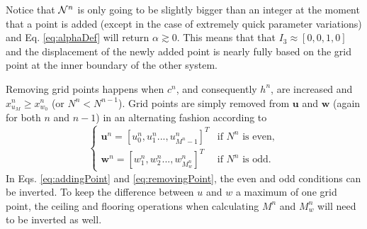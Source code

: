Notice that $\mathcal{N}^n$ is only going to be slightly bigger than an integer at the moment that a point is added (except in the case of extremely quick parameter variations) and Eq. \eqref{eq:alphaDef} will return $\alpha \gtrsim 0$.
This means that that $I_3 \approx [0, 0, 1, 0]$ and the displacement of the newly added point is nearly fully based on the grid point at the inner boundary of the other system. %

Removing grid points happens when $c^n$, and consequently $h^n$, are increased and $x_{u_M}^n \geq x_{w_0}^n$ (or $ N^n <  N^{n-1}$). %
Grid points are simply removed from $\mathbf{u}$ and $\mathbf{w}$ (again for both $n$ and $n-1$) in an alternating fashion according to
\begin{equation}\label{eq:removingPoint}
\begin{cases}
    \mathbf{u}^n = [u_0^n, u_1^n ..., u_{M^n-1}^n]^T & \text{if $N^n$ is even}, \\
     \mathbf{w}^n = [w_1^n, w_2^n ..., w_{M_w^n}^n]^T & \text{if $N^n$ is odd}.
    \end{cases}
\end{equation}
In Eqs. \eqref{eq:addingPoint} and \eqref{eq:removingPoint}, the even and odd conditions can be inverted. To keep the difference between $u$ and $w$ a maximum of one grid point, the ceiling and flooring operations when calculating $M^n$ and $M_w^n$ will need to be inverted as well.

